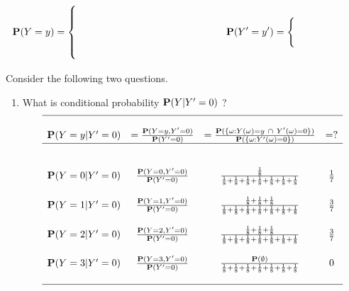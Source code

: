 {\begin{classwork}
\begin{eqnarray}
 \p(Y=y) =%
 \begin{cases}
 \qquad & \qquad \notag \\
 \qquad & \qquad \notag \\
 \qquad & \qquad \notag \\
 \qquad & \qquad \notag
 \end{cases} 
 & \qquad \qquad \qquad \qquad \qquad
\p(Y'=y') =%
 \begin{cases}
 \qquad & \qquad \notag \\
 \qquad & \qquad \notag 
 \end{cases}
 \end{eqnarray}
 \end{classwork}
 
 \begin{classwork}
 Consider the following two questions.
 \begin{enumerate}
\item What is conditional probability $\mathbf{P}(Y|Y'=0)$ ?
 \[
 \begin{array}{c c c c}
 \hline \\
 \mathbf{P}(Y=y | Y'=0) & =\frac{\mathbf{P}(Y=y,Y'=0)}{\mathbf{P}(Y'=0)} & =\frac{\mathbf{P}(\{\omega: Y(\omega)=y \  \cap \ Y'(\omega)=0\})}{\mathbf{P}(\{\omega: Y'(\omega)=0\})} & = ? \\ \hline \\
 \\
 \mathbf{P}(Y=0 | Y'=0) & \frac{\mathbf{P}(Y=0,Y'=0)}{\mathbf{P}(Y'=0)} & \frac{\frac{1}{8}}{\frac{1}{8}+\frac{1}{8}+\frac{1}{8}+\frac{1}{8}+\frac{1}{8}+\frac{1}{8}+\frac{1}{8}} & \frac{1}{7} \\
\\
\mathbf{P}(Y=1 | Y'=0) & \frac{\mathbf{P}(Y=1,Y'=0)}{\mathbf{P}(Y'=0)} & \frac{\frac{1}{8}+\frac{1}{8}+\frac{1}{8}}{\frac{1}{8}+\frac{1}{8}+\frac{1}{8}+\frac{1}{8}+\frac{1}{8}+\frac{1}{8}+\frac{1}{8}} & \frac{3}{7} \\
\\
\mathbf{P}(Y=2 | Y'=0) & \frac{\mathbf{P}(Y=2,Y'=0)}{\mathbf{P}(Y'=0)} & \frac{\frac{1}{8}+\frac{1}{8}+\frac{1}{8}}{\frac{1}{8}+\frac{1}{8}+\frac{1}{8}+\frac{1}{8}+\frac{1}{8}+\frac{1}{8}+\frac{1}{8}} & \frac{3}{7} \\
\\
\mathbf{P}(Y=3 | Y'=0) & \frac{\mathbf{P}(Y=3,Y'=0)}{\mathbf{P}(Y'=0)} & \frac{\mathbf{P}(\emptyset)}{\frac{1}{8}+\frac{1}{8}+\frac{1}{8}+\frac{1}{8}+\frac{1}{8}+\frac{1}{8}+\frac{1}{8}} & 0 \\
\\ \hline

\end{array}\]
\end{enumerate}
\end{classwork}}
